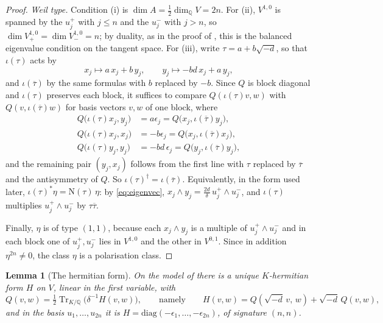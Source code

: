 \documentclass[11pt,reqno]{amsart}
\theoremstyle{plain}
\newtheorem{lemma}[theorem]{Lemma}
\theoremstyle{definition}
\theoremstyle{remark}
\newcommand{\QQ}{\mathbb{Q}}
\newcommand{\Nm}{\mathrm{N}}             %
\DeclareMathOperator{\Tr}{Tr}
\newcommand{\bbar}[1]{\overline{#1}}
\begin{document}
\begin{proof}
\emph{Weil type.} Condition (i) is $\dim A=\tfrac12\dim_{\QQ}V=2n$. For (ii),
$V^{1,0}$ is spanned by the $u_{j}^{+}$ with $j\le n$ and the $u_{j}^{-}$ with
$j>n$, so $\dim V^{1,0}_{+}=\dim V^{1,0}_{-}=n$; by duality, as in the proof
of , this is the balanced eigenvalue condition on the
tangent space. For (iii), write $\tau=a+b\sqrt{-d}$, so that $\iota(\tau)$
acts by
\[
  x_{j}\longmapsto a\,x_{j}+b\,y_{j},
  \qquad
  y_{j}\longmapsto -bd\,x_{j}+a\,y_{j},
\]
and $\iota(\bbar{\tau})$ by the same formulas with $b$ replaced by $-b$. Since
$Q$ is block diagonal and $\iota(\tau)$ preserves each block, it suffices to
compare $Q(\iota(\tau)v,w)$ with $Q(v,\iota(\bbar{\tau})w)$ for basis vectors
$v,w$ of one block, where
\begin{align*}
  Q\bigl(\iota(\tau)x_{j},y_{j}\bigr)&=a\epsilon_{j}
   =Q\bigl(x_{j},\iota(\bbar{\tau})y_{j}\bigr),\\
  Q\bigl(\iota(\tau)x_{j},x_{j}\bigr)&=-b\epsilon_{j}
   =Q\bigl(x_{j},\iota(\bbar{\tau})x_{j}\bigr),\\
  Q\bigl(\iota(\tau)y_{j},y_{j}\bigr)&=-bd\,\epsilon_{j}
   =Q\bigl(y_{j},\iota(\bbar{\tau})y_{j}\bigr),
\end{align*}
and the remaining pair $(y_{j},x_{j})$ follows from the first line with
$\tau$ replaced by $\bbar{\tau}$ and the antisymmetry of $Q$. So
$\iota(\tau)^{\dagger}=\iota(\bbar{\tau})$. Equivalently, in the form used
later, $\iota(\tau)^{*}\eta=\Nm(\tau)\,\eta$: by \eqref{eq:eigenvec},
$x_{j}\wedge y_{j}=\tfrac{2d}{\delta}\,u_{j}^{+}\wedge u_{j}^{-}$, and
$\iota(\tau)$ multiplies $u_{j}^{+}\wedge u_{j}^{-}$ by $\tau\bbar{\tau}$.

Finally, $\eta$ is of type $(1,1)$, because each $x_{j}\wedge y_{j}$ is a
multiple of $u_{j}^{+}\wedge u_{j}^{-}$ and in each block one of
$u_{j}^{+},u_{j}^{-}$ lies in $V^{1,0}$ and the other in $V^{0,1}$. Since in
addition $\eta^{2n}\ne0$, the class $\eta$ is a polarisation class.
\end{proof}

\begin{lemma}[The hermitian form]\label{lem:hermform}
On the model of  there is a unique $K$-hermitian form $H$ on
$V$, linear in the first variable, with
\begin{equation}\label{eq:QfromH}
  Q(v,w)=\tfrac12\Tr_{K/\QQ}\bigl(\delta^{-1}H(v,w)\bigr),
  \qquad\text{namely}\qquad
  H(v,w)=Q(\sqrt{-d}\,v,\,w)+\sqrt{-d}\,Q(v,w),
\end{equation}
and in the basis $u_{1},\dots,u_{2n}$ it is
$H=\mathrm{diag}(-\epsilon_{1},\dots,-\epsilon_{2n})$, of signature $(n,n)$.
\end{lemma}
\end{document}
